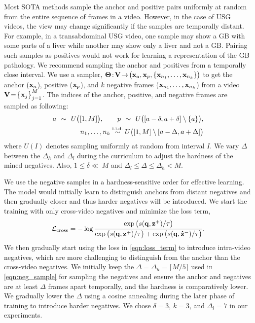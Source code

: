 %
Most SOTA methods sample the anchor and positive pairs uniformly at random from the entire sequence of frames in a video. However, in the case of USG videos, the view may change significantly if the samples are temporally distant. For example, in a transabdominal USG video, one sample may show a GB with some parts of a liver while another may show only a liver and not a GB. Pairing such samples as positives would not work for learning a representation of the GB pathology. We recommend sampling the anchor and positives from a temporally close interval. We use a sampler, $\vb{\Theta}\!:\!\vb{V}\!\rightarrow\!\big(\vb{x}_a, \vb{x}_p, \{\vb{x}_{n_1}, \ldots, \vb{x}_{n_k}\}\big)$ to get the anchor ($\vb{x}_a$), positive ($\vb{x}_p$), and $k$ negative frames ($\vb{x}_{n_1}, \ldots, \vb{x}_{n_k}$) from a video $\vb{V}\!=\!\big\{ \vb{x}_j\big\}_{j=1}^M$. The indices of the anchor, positive, and negative frames are sampled as following: 
%
\begin{align*}
a \overset{\hphantom{\text{i.i.d.}}}{\sim} U\big([1,M]\big), 
\qquad
p \overset{\hphantom{\text{i.i.d.}}}{\sim} U\big([a-\delta, a+\delta] \setminus \{a\}\big), 
\\ 
n_1, \ldots, n_k \overset{\text{i.i.d.}}{\sim} U\big([1,M] \setminus [a-\Delta,a+\Delta]\big)
\label{eqn:neg_sample}
\end{align*} 
%
where $U(I)$ denotes sampling uniformly at random from interval $I$. We vary $\Delta$ between the $\Delta_h$ and $\Delta_l$ during the curriculum to adjust the hardness of the mined negatives. Also, $1 \le \delta \ll\ \!M$ and $ \Delta_{l} \le \Delta \le \Delta_{h} < M$. 

%
We use the negative samples in a hardness-sensitive order for effective learning. The model would initially learn to distinguish anchors from distant negatives and then gradually closer and thus harder negatives will be introduced. We start the training with only cross-video negatives and minimize the loss term, 
%
\begin{align}
    \mathcal{L}_{\text{cross}} = -\log \frac{\exp\big(s(\vb{q}, \vb{z}^+)/\tau\big)}{\exp\big(s(\vb{q}, \vb{z}^+)/\tau\big) + \exp\big(s(\vb{q}, \vb{\hat{z}}^-)/\tau\big)}.
\end{align}
We then gradually start using the loss in \cref{eqn:loss_term} to introduce intra-video negatives, which are more challenging to distinguish from the anchor than the cross-video negatives. We initially keep the $\Delta= \Delta_h =\lceil M/5\rceil$ used in \cref{eqn:neg_sample} for sampling the negatives and ensure the anchor and negatives are at least $\Delta$ frames apart temporally, and the hardness is comparatively lower. We gradually lower the $\Delta$ using a cosine annealing during the later phase of training to introduce harder negatives. We chose $\delta=3$, $k=3$, and  $\Delta_l=7$ in our experiments.

